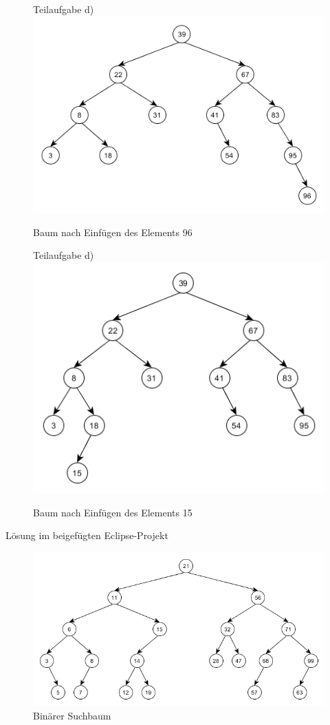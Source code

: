 \documentclass[12pt]{scrartcl}
\begin{document}
\begin{figure}[h!]
\begin{center}
Teilaufgabe d)
\includegraphics[scale=0.8]{Aufgabe2d)B5.png}
\caption{Baum nach Einfügen des Elements 96}
\end{center}
\end{figure}

\begin{figure}[h!]
\begin{center}
Teilaufgabe d)
\includegraphics[scale=0.8]{Aufgabe2d)B6.png}
\caption{Baum nach Einfügen des Elements 15}
\end{center}
\end{figure}

\exercise{}
Lösung im beigefügten Eclipse-Projekt

\exercise{}
\begin{figure}[h!]
\begin{center}
\includegraphics[scale=0.8]{Aufgabe4Binaerbaum.png}
\caption{Binärer Suchbaum}
\end{center}
\end{figure}

\end{document}
